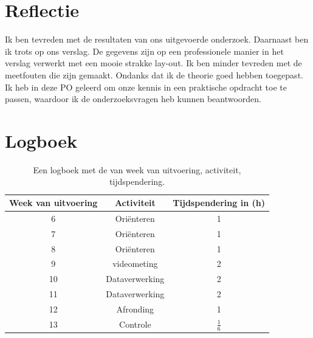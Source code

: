 \documentclass[numbers=endperiod]{scrartcl}
\begin{document}
\section{Reflectie}
Ik ben tevreden met de resultaten van ons uitgevoerde onderzoek. Daarnaast
ben ik trots op ons verslag. De gegevens zijn op een professionele
manier in het verslag verwerkt met een mooie strakke lay-out. Ik ben minder
tevreden met de meetfouten die zijn gemaakt. Ondanks dat ik de theorie
goed hebben toegepast. Ik heb in deze PO geleerd om onze kennis in
een praktische opdracht toe te passen, waardoor ik de onderzoeksvragen
heb kunnen beantwoorden.


\newpage
\appendix
\section{Logboek}
\begin{table}[ht]
\centering
\caption{Een logboek met de van week van uitvoering, activiteit, tijdspendering.}
\begin{tabular}{Scc}
\toprule
{Week van uitvoering} & Activiteit & Tijdspendering in (\si{\hour})\\
 & Oriënteren & 1\\
7 & Oriënteren & 1\\
8 & Oriënteren & 1\\
9 & videometing & 2\\
10 & Dataverwerking & 2\\
11 & Dataverwerking & 2\\
12 & Afronding & 1\\
13 & Controle & $\frac{1}{6}$\\
\bottomrule
\end{tabular}
\end{table}
\end{document}
